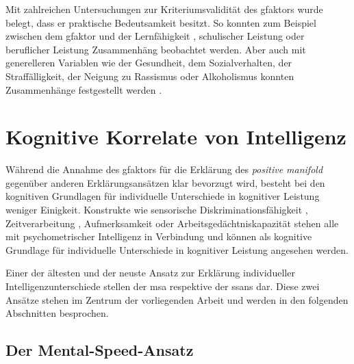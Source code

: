 \documentclass[11pt, twoside, a4paper]{book}		%
\begin{document}
Mit zahlreichen Untersuchungen zur Kriteriumsvalidität des \gls{gfaktor}s wurde belegt, dass er praktische Bedeutsamkeit besitzt. So konnten zum Beispiel zwischen dem \gls{gfaktor} und der Lernfähigkeit \citep{Christal1991}, schulischer Leistung \citep{Jensen1998b} oder beruflicher Leistung \citep{Schmidt2004} Zusammenhäng beobachtet werden. Aber auch mit generelleren Variablen wie der Gesundheit, dem Sozialverhalten, der Straffälligkeit, der Neigung zu Rassismus oder Alkoholismus konnten Zusammenhänge festgestellt werden \citep[für eine Übersicht siehe][]{Brand1987}.




\section{Kognitive Korrelate von Intelligenz}

Während die Annahme des \gls{gfaktor}s für die Erklärung des \textit{positive manifold} gegenüber anderen Erklärungsansätzen klar bevorzugt wird, besteht bei den kognitiven Grundlagen für individuelle Unterschiede in kognitiver Leistung weniger Einigkeit. 
Konstrukte wie sensorische Diskriminationsfähigkeit \citep[z. B.][]{Galton1883, Spearman1904, Deary2004, Meyer2010}, Zeitverarbeitung \citep[z. B.][]{Rammsayer2002}, Aufmerksamkeit \citep[z. B.][]{Schweizer2004} oder Arbeitsgedächtniskapazität \citep[für eine Übersichtsarbeit siehe][]{Ackerman2005} stehen alle mit psychometrischer Intelligenz in Verbindung und können als kognitive Grundlage für individuelle Unterschiede in kognitiver Leistung angesehen werden. 

Einer der ältesten und der neuste Ansatz zur Erklärung individueller Intelligenzunterschiede stellen der \gls{msa} respektive der \gls{ssans} dar.
Diese zwei Ansätze stehen im Zentrum der vorliegenden Arbeit und werden in den folgenden Abschnitten besprochen.


\subsection{Der Mental-Speed-Ansatz \label{subsec:Der Mental-Speed-Ansatz}}
\end{document}

